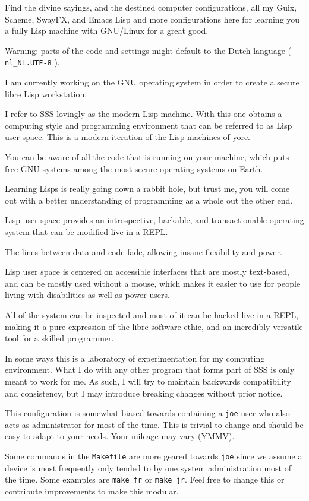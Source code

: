 \documentclass[11pt]{article}
\begin{document}
Find the divine sayings, and the destined computer configurations, all my Guix, Scheme, SwayFX, and Emacs Lisp and more configurations here for learning you a fully Lisp machine with GNU/Linux for a great good.

Warning: parts of the code and settings might default to the Dutch language ( \texttt{nl\_NL.UTF-8} ).


I am currently working on the GNU operating system in order to create a secure libre Lisp workstation.

I refer to SSS lovingly as the modern Lisp machine. With this one obtains a computing style and programming environment that can be referred to as Lisp user space. This is a modern iteration of the Lisp machines of yore.

You can be aware of all the code that is running on your machine, which puts free GNU systems among the most secure operating systems on Earth.

Learning Lisps is really going down a rabbit hole, but trust me, you will come out with a better understanding of programming as a whole out the other end.

Lisp user space provides an introspective, hackable, and transactionable operating system that can be modified live in a REPL.

The lines between data and code fade, allowing insane flexibility and power.

Lisp user space is centered on accessible interfaces that are mostly text-based, and can be mostly used without a mouse, which makes it easier to use for people living with disabilities as well as power users.

All of the system can be inspected and most of it can be hacked live in a REPL, making it a pure expression of the libre software ethic, and an incredibly versatile tool for a skilled programmer.

In some ways this is a laboratory of experimentation for my computing environment. What I do with any other program that forms part of SSS is only meant to work for me. As such, I will try to maintain backwards compatibility and consistency, but I may introduce breaking changes without prior notice.

This configuration is somewhat biased towards containing a \texttt{joe} user who also acts as administrator for most of the time. This is trivial to change and should be easy to adapt to your needs. Your mileage may vary (YMMV).

Some commands in the \texttt{Makefile} are more geared towards \texttt{joe} since we assume a device is most frequently only tended to by one system administration most of the time. Some examples are \texttt{make fr} or \texttt{make jr}. Feel free to change this or contribute improvements to make this modular.
\end{document}

